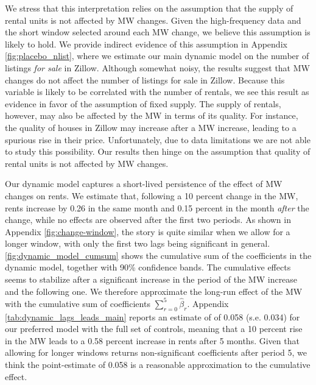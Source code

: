 We stress that this interpretation relies on the assumption that the supply of rental units is 
not affected by MW changes. Given the high-frequency data and the short window selected 
around each MW change, we believe this assumption is likely to hold. We provide indirect evidence 
of this assumption in Appendix \autoref{fig:placebo_nlist}, where we estimate our main dynamic 
model on the number of listings \textit{for sale} in Zillow. Although somewhat noisy, the results 
suggest that MW changes do not affect the number of listings for sale in Zillow. Because this 
variable is likely to be correlated with the number of rentals, we see this result as evidence in 
favor of the assumption of fixed supply. The supply of rentals, however, may also be affected by 
the MW in terms of its quality. For instance, the quality of houses in Zillow may increase after 
a MW increase, leading to a spurious rise in their price.  Unfortunately, due to data limitations 
we are not able to study this possibility. Our results then hinge on the assumption that quality 
of rental units is not affected by MW changes.

Our dynamic model captures a short-lived persistence of the effect of MW changes on rents. We 
estimate that, following a 10 percent change in the MW, rents increase by 0.26 in the same month 
and 0.15 percent in the month \textit{after} the change, while no effects are observed after the 
first two periods. As shown in Appendix \autoref{fig:change-window}, the story is quite similar 
when we allow for a longer window, with only the first two lags being significant in general.
\autoref{fig:dynamic_model_cumsum} shows the cumulative sum of the coefficients in the dynamic 
model, together with 90\% confidence bands. The cumulative effects seems to stabilize after a 
significant increase in the period of the MW increase and the following one. We therefore approximate 
the long-run effect of the MW with the cumulative sum of coefficients $\sum_{r=0}^{5} \hat{\beta}_{r}$.
Appendix \autoref{tab:dynamic_lags_leads_main} reports an estimate of of 0.058 (s.e. 0.034) for our 
preferred model with the full set of controls, meaning that a 10 percent rise in the MW leads to a 0.58 
percent increase in rents after 5 months. Given that allowing for longer windows returns non-significant 
coefficients after period 5, we think the point-estimate of 0.058 is a reasonable approximation to the 
cumulative effect.

